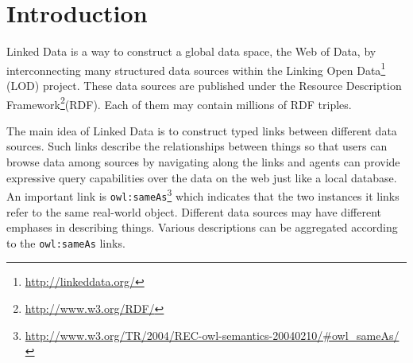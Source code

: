 \section{Introduction}

Linked Data\cite{bizer2009linked} is a way to construct a global data space, the Web of Data, by interconnecting many structured data sources within the Linking Open Data\footnote{\url{http://linkeddata.org/}} (LOD) project. These data sources are published under the Resource Description Framework\footnote{\url{http://www.w3.org/RDF/}}(RDF). Each of them may contain millions of RDF triples.

The main idea of Linked Data is to construct typed links between different data sources. Such links describe the relationships between things so that users can browse data among sources by navigating along the links and agents can provide expressive query capabilities over the data on the web just like a local database. An important link is \texttt{owl:sameAs}\footnote{\url{http://www.w3.org/TR/2004/REC-owl-semantics-20040210/\#owl\_sameAs/}} which indicates that the two instances it links refer to the same real-world object. Different data sources may have different emphases in describing things. Various descriptions can be aggregated according to the \texttt{owl:sameAs} links.


